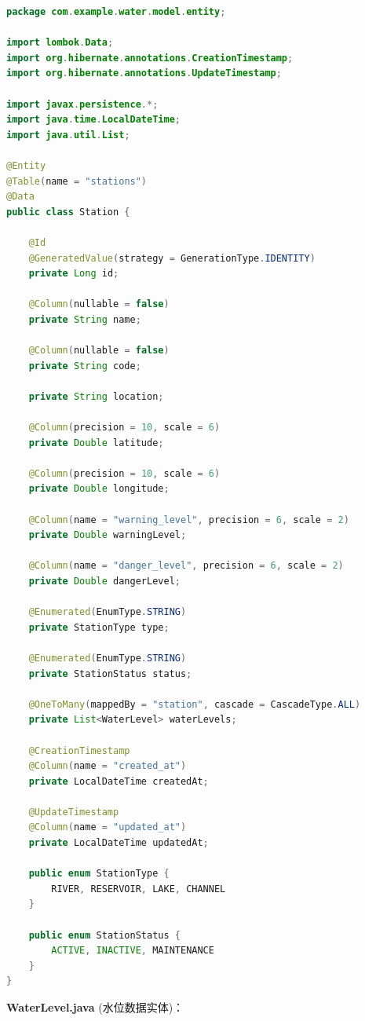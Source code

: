 \begin{lstlisting}[language=Java]
package com.example.water.model.entity;

import lombok.Data;
import org.hibernate.annotations.CreationTimestamp;
import org.hibernate.annotations.UpdateTimestamp;

import javax.persistence.*;
import java.time.LocalDateTime;
import java.util.List;

@Entity
@Table(name = "stations")
@Data
public class Station {
    
    @Id
    @GeneratedValue(strategy = GenerationType.IDENTITY)
    private Long id;
    
    @Column(nullable = false)
    private String name;
    
    @Column(nullable = false)
    private String code;
    
    private String location;
    
    @Column(precision = 10, scale = 6)
    private Double latitude;
    
    @Column(precision = 10, scale = 6)
    private Double longitude;
    
    @Column(name = "warning_level", precision = 6, scale = 2)
    private Double warningLevel;
    
    @Column(name = "danger_level", precision = 6, scale = 2)
    private Double dangerLevel;
    
    @Enumerated(EnumType.STRING)
    private StationType type;
    
    @Enumerated(EnumType.STRING)
    private StationStatus status;
    
    @OneToMany(mappedBy = "station", cascade = CascadeType.ALL)
    private List<WaterLevel> waterLevels;
    
    @CreationTimestamp
    @Column(name = "created_at")
    private LocalDateTime createdAt;
    
    @UpdateTimestamp
    @Column(name = "updated_at")
    private LocalDateTime updatedAt;
    
    public enum StationType {
        RIVER, RESERVOIR, LAKE, CHANNEL
    }
    
    public enum StationStatus {
        ACTIVE, INACTIVE, MAINTENANCE
    }
}
\end{lstlisting}

\textbf{WaterLevel.java} (水位数据实体)：

